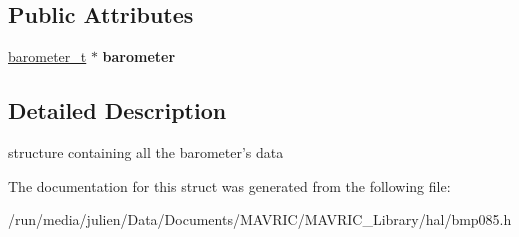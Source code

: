 \subsection*{Public Attributes}
\begin{DoxyCompactItemize}
\item 
\hypertarget{structbmp085__t_a6008891689074fa322e8731a82f37794}{\hyperlink{structbarometer__t}{barometer\+\_\+t} $\ast$ {\bfseries barometer}}\label{structbmp085__t_a6008891689074fa322e8731a82f37794}

\end{DoxyCompactItemize}


\subsection{Detailed Description}
structure containing all the barometer's data 

The documentation for this struct was generated from the following file\+:\begin{DoxyCompactItemize}
\item 
/run/media/julien/\+Data/\+Documents/\+M\+A\+V\+R\+I\+C/\+M\+A\+V\+R\+I\+C\+\_\+\+Library/hal/bmp085.\+h\end{DoxyCompactItemize}
